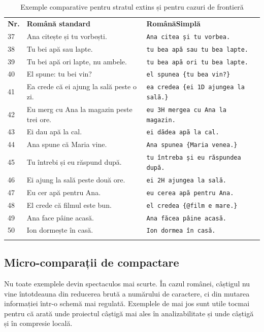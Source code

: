 \documentclass[12pt,onecolumn,letterpaper]{article}
\newcommand{\rs}[1]{\texttt{#1}}
\newcommand{\RSDenseTablelayout}{%
\footnotesize
\setlength{\tabcolsep}{4pt}%
\renewcommand{\arraystretch}{1.03}%
\setlength{\LTleft}{\fill}%
\setlength{\LTright}{\fill}%
\arrayrulecolor{RSRule}%
}
\begin{document}
\RSDenseTablelayout
\begin{longtable}{@{}p{0.5cm}p{5.45cm}p{5.45cm}@{}}
\rowcolor{RSGray}
\textbf{Nr.} & \textbf{Română standard} & \textbf{RomânăSimplă} \\
37 & Ana citește și tu vorbești. & \rs{Ana citea și tu vorbea.} \\
38 & Tu bei apă sau lapte. & \rs{tu bea apă sau tu bea lapte.} \\
39 & Tu bei apă ori lapte, nu ambele. & \rs{tu bea apă ori tu bea lapte.} \\
40 & El spune: tu bei vin? & \rs{el spunea \{tu bea vin?\}} \\
41 & Ea crede că ei ajung la sală peste o zi. & \rs{ea credea \{ei 1D ajungea la sală.\}} \\
42 & Eu merg cu Ana la magazin peste trei ore. & \rs{eu 3H mergea cu Ana la magazin.} \\
43 & Ei dau apă la cal. & \rs{ei dădea apă la cal.} \\
44 & Ana spune că Maria vine. & \rs{Ana spunea \{Maria venea.\}} \\
45 & Tu întrebi și eu răspund după. & \rs{tu întreba și eu răspundea după.} \\
46 & Ei ajung la sală peste două ore. & \rs{ei 2H ajungea la sală.} \\
47 & Eu cer apă pentru Ana. & \rs{eu cerea apă pentru Ana.} \\
48 & El crede că filmul este bun. & \rs{el credea \{@film e mare.\}} \\
49 & Ana face pâine acasă. & \rs{Ana făcea pâine acasă.} \\
50 & Ion dormește în casă. & \rs{Ion dormea în casă.} \\
\bottomrule
\caption{Exemple comparative pentru stratul extins și pentru cazuri de frontieră}
\end{longtable}

\subsection{Micro-comparații de compactare}

Nu toate exemplele devin spectaculos mai scurte. În cazul românei, câștigul nu
vine întotdeauna din reducerea brută a numărului de caractere, ci din mutarea
informației într-o schemă mai regulată. Exemplele de mai jos sunt utile tocmai
pentru că arată unde proiectul câștigă mai ales în analizabilitate și unde
câștigă și în compresie locală.
\end{document}
